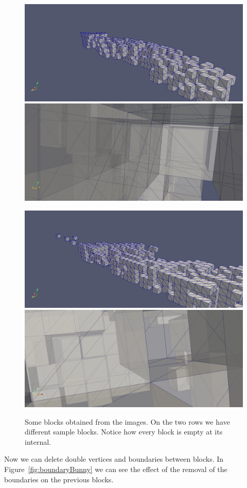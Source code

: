 \begin{figure}[htb] %
   \centering
   \includegraphics[width=0.49\linewidth]{images/Bunnyblock2.png}\hfill
   \includegraphics[width=0.49\linewidth]{images/Bunnyblock1.png}\newline
   
   \includegraphics[width=0.49\linewidth]{images/Bunnyblock5.png}\hfill
   \includegraphics[width=0.49\linewidth]{images/Bunnyblock4.png}
   \caption[Some blocks obtained from the images]{Some blocks obtained from the images. On the two rows we have different sample blocks. Notice how every block is empty at its internal.}
   \label{fig:blockBunny}
\end{figure}

Now we can delete double vertices and boundaries between blocks. In Figure~\ref{fig:boundaryBunny} we can see the effect of the removal of the boundaries on the previous blocks.

